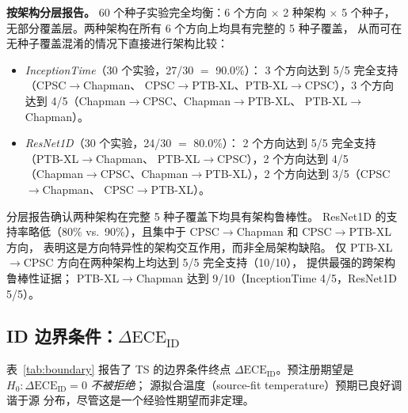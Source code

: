 \textbf{按架构分层报告。} 60 个种子实验完全均衡：6 个方向 $\times$ 2 种架构 $\times$
5 个种子，无部分覆盖层。两种架构在所有 6 个方向上均具有完整的 5 种子覆盖，
从而可在无种子覆盖混淆的情况下直接进行架构比较：
\begin{itemize}
    \item \emph{InceptionTime}（30 个实验，27/30 $=$ 90.0\%）：
    3 个方向达到 5/5 完全支持（CPSC$\rightarrow$Chapman、
    CPSC$\rightarrow$PTB-XL、PTB-XL$\rightarrow$CPSC），3 个方向
    达到 4/5（Chapman$\rightarrow$CPSC、Chapman$\rightarrow$PTB-XL、
    PTB-XL$\rightarrow$Chapman）。
    \item \emph{ResNet1D}（30 个实验，24/30 $=$ 80.0\%）：
    2 个方向达到 5/5 完全支持（PTB-XL$\rightarrow$Chapman、
    PTB-XL$\rightarrow$CPSC），2 个方向达到 4/5
    （Chapman$\rightarrow$CPSC、Chapman$\rightarrow$PTB-XL），2
    个方向达到 3/5（CPSC$\rightarrow$Chapman、
    CPSC$\rightarrow$PTB-XL）。
\end{itemize}
分层报告确认两种架构在完整 5 种子覆盖下均具有架构鲁棒性。
ResNet1D 的支持率略低（80\% vs.\ 90\%），且集中于
CPSC$\rightarrow$Chapman 和 CPSC$\rightarrow$PTB-XL 方向，
表明这是方向特异性的架构交互作用，而非全局架构缺陷。
仅 PTB-XL$\rightarrow$CPSC 方向在两种架构上均达到 5/5 完全支持（10/10），
提供最强的跨架构鲁棒性证据；
PTB-XL$\rightarrow$Chapman 达到 9/10（InceptionTime 4/5，ResNet1D 5/5）。

\subsection{ID 边界条件：$\Delta\text{ECE}_{\text{ID}}$}
\label{sec:boundary}
表~\ref{tab:boundary} 报告了 TS 的边界条件终点
$\Delta\text{ECE}_{\text{ID}}$。预注册期望是
$H_0:\Delta\text{ECE}_{\text{ID}}=0$ \emph{不被拒绝}；
源拟合温度（source-fit temperature）预期已良好调谐于源
分布，尽管这是一个经验性期望而非定理。


